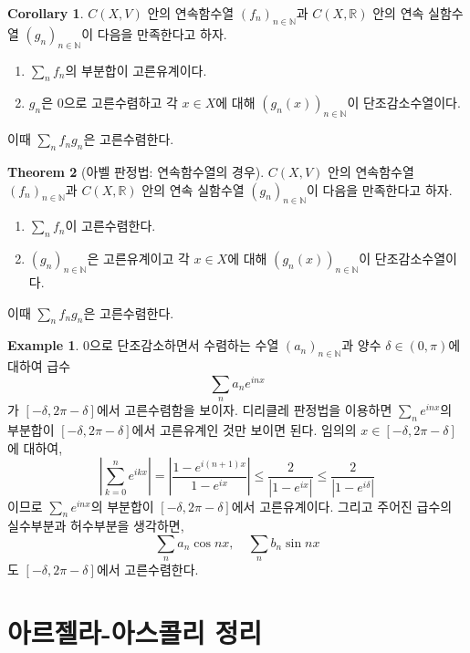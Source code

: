 \documentclass[11pt]{book}
\numberwithin{equation}{chapter}
\def\NN{\mathbb{N}}
\def\RR{\mathbb{R}}
\newcommand{\abs}[1]{\left\vert#1\right\vert}
\theoremstyle{definition}
\newtheorem{thm}{Theorem}[section]
\newtheorem{cor}[thm]{Corollary}
\newtheorem*{ex}{Example}
\newenvironment{enum}
	{\begin{enumerate}[label=(\alph*), leftmargin=2\parindent]}
	{\end{enumerate}}
\begin{document}
\begin{cor}
    \(C(X, V)\) 안의 연속함수열 \((f_n)_{n \in \NN}\)과 \(C(X, \RR)\) 안의 연속 실함수열 \((g_n)_{n \in \NN}\)이 다음을 만족한다고 하자.
    \begin{enum}
        \item \(\sum_n f_n\)의 부분합이 고른유계이다.
        \item \(g_n\)은 0으로 고른수렴하고 각 \(x \in X\)에 대해 \((g_n(x))_{n \in \NN}\)이 단조감소수열이다.
    \end{enum}
    이때 \(\sum_n f_n g_n\)은 고른수렴한다.
\end{cor}

\begin{thm}[아벨 판정법: 연속함수열의 경우]
    \(C(X, V)\) 안의 연속함수열 \((f_n)_{n \in \NN}\)과 \(C(X, \RR)\) 안의 연속 실함수열 \((g_n)_{n \in \NN}\)이 다음을 만족한다고 하자.
    \begin{enum}
        \item \(\sum_n f_n\)이 고른수렴한다.
        \item \((g_n)_{n \in \NN}\)은 고른유계이고 각 \(x \in X\)에 대해 \((g_n(x))_{n \in \NN}\)이 단조감소수열이다.
    \end{enum}
    이때 \(\sum_n f_n g_n\)은 고른수렴한다.
\end{thm}

\begin{ex}
    0으로 단조감소하면서 수렴하는 수열 \((a_n)_{n \in \NN}\)과 양수 \(\delta \in (0, \pi)\)에 대하여 급수
        \[
        \sum_n a_n e^{inx}    
        \]
        가 \([-\delta, 2\pi - \delta]\)에서 고른수렴함을 보이자. 디리클레 판정법을 이용하면 \(\sum_n e^{inx}\)의 부분합이 \([-\delta, 2\pi - \delta]\)에서 고른유계인 것만 보이면 된다. 임의의 \(x \in [-\delta, 2\pi - \delta]\)에 대하여,
        \[
        \abs{\sum_{k=0}^n e^{ikx}} = \abs{\frac{1 - e^{i(n+1)x}}{1 - e^{ix}}} \le \frac{2}{\abs{1 - e^{ix}}} \le \frac{2}{\abs{1 - e^{i\delta}}} 
        \]
        이므로 \(\sum_n e^{inx}\)의 부분합이 \([-\delta, 2\pi - \delta]\)에서 고른유계이다. 그리고 주어진 급수의 실수부분과 허수부분을 생각하면,
        \[
        \sum_n a_n \cos nx, \quad \sum_n b_n \sin nx    
        \]
        도 \([-\delta, 2\pi - \delta]\)에서 고른수렴한다.
\end{ex}

\section{아르젤라-아스콜리 정리}
\end{document}
